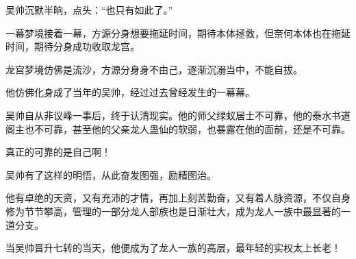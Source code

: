 \begin{this_body}
吴帅沉默半晌，点头：“也只有如此了。”

一幕梦境接着一幕，方源分身想要拖延时间，期待本体拯救，但奈何本体也在拖延时间，期待分身成功收取龙宫。

龙宫梦境仿佛是流沙，方源分身身不由己，逐渐沉溺当中，不能自拔。

他仿佛化身成了当年的吴帅，经过过去曾经发生的一幕幕。

吴帅自从非议峰一事后，终于认清现实。他的师父绿蚁居士不可靠，他的泰水书道阁主也不可靠，甚至他的父亲龙人蛊仙的软弱，也暴露在他的面前，还是不可靠。

真正的可靠的是自己啊！

吴帅有了这样的明悟，从此奋发图强，励精图治。

他有卓绝的天资，又有充沛的才情，再加上刻苦勤奋，又有着人脉资源，不仅自身修为节节攀高，管理的一部分龙人部族也是日渐壮大，成为龙人一族中最显著的一道分支。

当吴帅晋升七转的当天，他便成为了龙人一族的高层，最年轻的实权太上长老！

\end{this_body}

